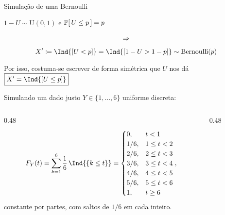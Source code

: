 \documentclass[aspectratio=169]{beamer}
\begin{document}
\begin{frame}{Simulação de uma Bernoulli}

  \begin{center}
    $1-U\sim \mathrm{U}(0,1)$ e $\ProbE{U\leq p}=p$    
  \end{center}
  $$\Rightarrow$$
  \[ X'\coloneqq \Ind{\colch{U <  p}}  = \Ind{\colch{1-U > 1-p}} \sim \mathrm{Bernoulli}(p)\]

  \bigskip
  
  Por isso, costuma-se escrever de forma simétrica que $U$ nos dá
  \(
  \boxed{X'=  \Ind{\colch{U \leq   p}}}
  \)
\end{frame}

\begin{frame}{Simulando um dado justo}
  $Y\in\{1,\dots,6\}$ uniforme discreta:
  \begin{columns}[T]
    
    \begin{column}{0.48\textwidth}
      \[
        F_Y(t) = \sum_{k=1}^{6} \frac{1}{6}\,\Ind{\{k\leq t\}}= 
        \begin{cases}
          0, & t < 1 \\
          1/6, & 1 \leq t < 2 \\
          2/6, & 2 \leq t < 3 \\
          3/6, & 3 \leq t < 4 \\
          4/6, & 4 \leq t < 5 \\
          5/6, & 5 \leq t < 6 \\
          1, & t \geq 6
        \end{cases},
      \]
      constante por partes, com saltos de $1/6$ em cada inteiro.
    \end{column}
    \def\yscale{3}
    \def\xscale{.8}
    \begin{column}{0.48\textwidth}
      \begin{center}
\end{center}
\end{column}
\end{columns}
\end{frame}
\end{document}
